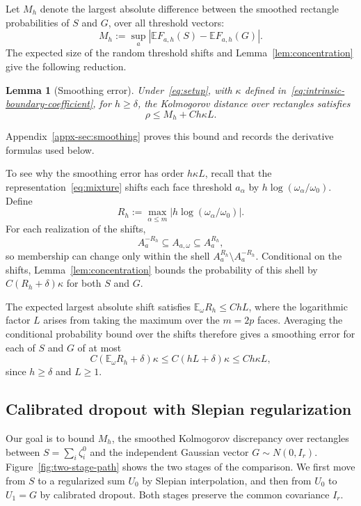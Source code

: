 \documentclass[11pt,letterpaper,twoside,leqno]{article}
\theoremstyle{bookplain}
\newtheorem{lemma}{Lemma}
\theoremstyle{bookremark}
\newcommand{\E}{\mathbb E}
\begin{document}
{Let \(M_h\) denote the largest absolute difference between the
smoothed rectangle probabilities of \(S\) and \(G\), over all threshold vectors:}
\[
 M_h:=\sup_a|\E F_{a,h}(S)-\E F_{a,h}(G)|.
\]
{The expected size of the random threshold shifts and
Lemma~\ref{lem:concentration} give the following reduction.}
\begin{lemma}[Smoothing error]\label{lem:endpoint}
{Under~\eqref{eq:setup}, with \(\kappa\) defined in~\eqref{eq:intrinsic-boundary-coefficient}, for \(h\ge\delta\),} the {Kolmogorov distance over rectangles satisfies}
\begin{equation}
 \rho\le M_h+Ch{\kappa L}.
 \label{eq:endpoint-min}
\end{equation}
\end{lemma}
Appendix~\ref{appx-sec:smoothing} proves this bound and records the
derivative formulas used below. {To see why the smoothing error has
order \(h{\kappa L}\), recall that the representation~\eqref{eq:mixture}
shifts each face threshold \(a_\alpha\) by
\(h\log(\omega_\alpha/\omega_0)\). {Define}
\[
 R_h:=\max_{\alpha\le m}
 \bigl|h\log(\omega_\alpha/\omega_0)\bigr|.
\]
For each realization of the shifts,
\[
 A_a^{-R_h}\subseteq A_{a,\omega}\subseteq A_a^{R_h},
\]
so membership can change only within the shell
\(A_a^{R_h}\setminus A_a^{-R_h}\). Conditional on the shifts,
Lemma~\ref{lem:concentration} bounds the probability of this shell
by \(C(R_h+\delta){\kappa}\) {for both \(S\) and \(G\).}

The expected largest absolute shift satisfies \(\E_\omega R_h\le ChL\),
where the logarithmic factor \(L\) arises from taking the maximum over the
\(m=2p\) faces. Averaging the conditional probability bound over the shifts
therefore gives {a smoothing error for each of \(S\) and \(G\)} of at most
\[
 C(\E_\omega R_h+\delta){\kappa}
 \le C(hL+\delta){\kappa}
 \le Ch{\kappa L},
\]
since \(h\ge\delta\) and \(L\ge1\).}


\subsection{Calibrated dropout with Slepian regularization}
\label{sec:outline-path}

{Our goal is to bound \(M_h\), the {smoothed Kolmogorov discrepancy over rectangles} between
\(S=\sum_i\zeta_i^0\) and the independent Gaussian vector \(G\sim N(0,I_r)\).
Figure~\ref{fig:two-stage-path} shows the two stages of the comparison.
We first move from \(S\) to a regularized sum \(U_0\) by Slepian interpolation,
and then from \(U_0\) to \(U_1=G\) by calibrated dropout.
Both stages preserve the common covariance \(I_r\).}
\end{document}
